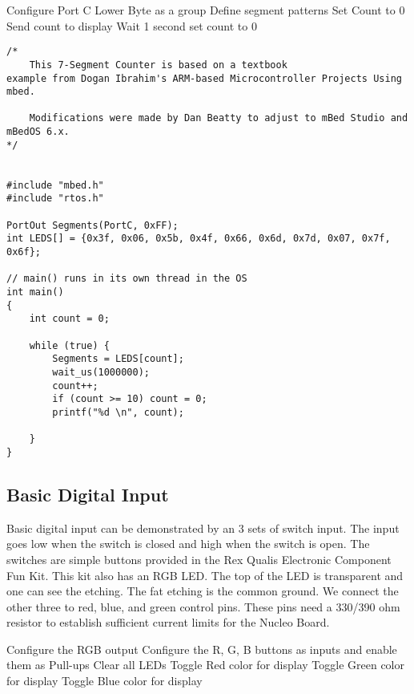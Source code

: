 \documentclass{article}
\begin{document}
\begin{algorithmic}
	\STATE Configure Port C Lower Byte as a group
	\STATE Define segment patterns
	\STATE Set Count to 0  
		\STATE Send count to display
		\STATE Wait 1 second
			\STATE set count to 0
		\ENDIF
	\ENDWHILE
\end{algorithmic}

\begin{lstlisting}
/*
	This 7-Segment Counter is based on a textbook 
example from Dogan Ibrahim's ARM-based Microcontroller Projects Using mbed.

	Modifications were made by Dan Beatty to adjust to mBed Studio and mBedOS 6.x.
*/


#include "mbed.h"
#include "rtos.h"

PortOut Segments(PortC, 0xFF);
int LEDS[] = {0x3f, 0x06, 0x5b, 0x4f, 0x66, 0x6d, 0x7d, 0x07, 0x7f, 0x6f};

// main() runs in its own thread in the OS
int main()
{
	int count = 0;
	
    while (true) {
		Segments = LEDS[count];
		wait_us(1000000);
		count++;
		if (count >= 10) count = 0;
        printf("%d \n", count);

    }
}
\end{lstlisting}






\subsection{Basic Digital Input} %
\label{sub:basic_digital_input}

Basic digital input can be demonstrated by an 3 sets of switch input.  The input goes low when the switch is closed and high when the switch is open.  The switches are simple buttons provided in the Rex Qualis Electronic Component Fun Kit.  This kit also has an RGB LED.  The top of the LED is transparent and one can see the etching.  The fat etching is the common ground.  We connect the other three to red, blue, and green control pins.  These pins need a 330/390 ohm resistor to establish sufficient current limits for the Nucleo Board.

\begin{algorithmic}
	\STATE Configure the RGB output
	\STATE Configure the R, G, B buttons as inputs and enable them as Pull-ups
	\STATE Clear all LEDs
		\STATE Toggle Red color for display
		\ENDIF
		\STATE Toggle Green color for display
		\ENDIF
		\STATE Toggle Blue color for display
		\ENDIF
	\ENDWHILE
\end{algorithmic}
\end{document}

